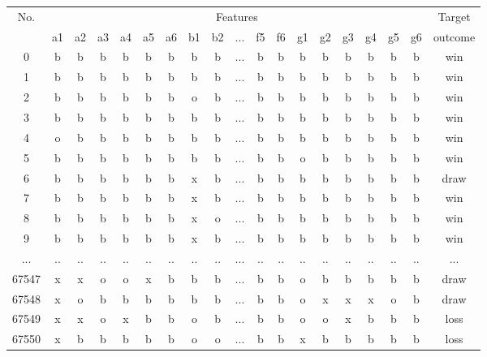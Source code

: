 \documentclass{article}
\begin{document}
\begin{table}[h!]
\centering
\begin{tabular}{ | c | c c c c c c c c c c c c c c c c c | c | }

\hline
\multirow{2}{*}{No.}       & \multicolumn{17}{c|}{Features}                                    &  Target \\
\cline{2-19}
       & a1 & a2 & a3 & a4 & a5 & a6 & b1 & b2 & ... & f5 & f6 & g1 & g2 & g3 & g4 & g5 & g6 & outcome \\
\hline
0      &  b &  b &  b &  b &  b &  b &  b &  b & ... &  b &  b &  b &  b &  b &  b &  b &  b &     win \\
1      &  b &  b &  b &  b &  b &  b &  b &  b & ... &  b &  b &  b &  b &  b &  b &  b &  b &     win \\
2      &  b &  b &  b &  b &  b &  b &  o &  b & ... &  b &  b &  b &  b &  b &  b &  b &  b &     win \\
3      &  b &  b &  b &  b &  b &  b &  b &  b & ... &  b &  b &  b &  b &  b &  b &  b &  b &     win \\
4      &  o &  b &  b &  b &  b &  b &  b &  b & ... &  b &  b &  b &  b &  b &  b &  b &  b &     win \\
5      &  b &  b &  b &  b &  b &  b &  b &  b & ... &  b &  b &  o &  b &  b &  b &  b &  b &     win \\
6      &  b &  b &  b &  b &  b &  b &  x &  b & ... &  b &  b &  b &  b &  b &  b &  b &  b &    draw \\
7      &  b &  b &  b &  b &  b &  b &  x &  b & ... &  b &  b &  b &  b &  b &  b &  b &  b &     win \\
8      &  b &  b &  b &  b &  b &  b &  x &  o & ... &  b &  b &  b &  b &  b &  b &  b &  b &     win \\
9      &  b &  b &  b &  b &  b &  b &  x &  b & ... &  b &  b &  b &  b &  b &  b &  b &  b &     win \\
...    & .. & .. & .. & .. & .. & .. & .. & .. & ... & .. & .. & .. & .. & .. & .. & .. & .. &     ... \\
67547  &  x &  x &  o &  o &  x &  b &  b &  b & ... &  b &  b &  o &  b &  b &  b &  b &  b &    draw \\
67548  &  x &  o &  b &  b &  b &  b &  b &  b & ... &  b &  b &  o &  x &  x &  x &  o &  b &    draw \\
67549  &  x &  x &  o &  x &  b &  b &  o &  b & ... &  b &  b &  o &  o &  x &  b &  b &  b &    loss \\
67550  &  x &  b &  b &  b &  b &  b &  o &  o & ... &  b &  b &  x &  b &  b &  b &  b &  b &    loss \\

\end{tabular}
\end{table}
\end{document}
